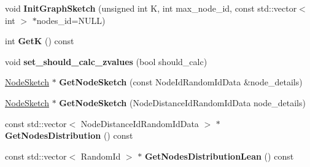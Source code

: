 \begin{DoxyCompactItemize}
\item 
\hypertarget{classall__distance__sketch_1_1GraphSketch_a6d41436a73844dd633b6184a89ce83ff}{}void {\bfseries Init\+Graph\+Sketch} (unsigned int K, int max\+\_\+node\+\_\+id, const std\+::vector$<$ int $>$ $\ast$nodes\+\_\+id=N\+U\+L\+L)\label{classall__distance__sketch_1_1GraphSketch_a6d41436a73844dd633b6184a89ce83ff}

\item 
\hypertarget{classall__distance__sketch_1_1GraphSketch_a32fef9d13b965dd7b5a776596d888a41}{}int {\bfseries Get\+K} () const \label{classall__distance__sketch_1_1GraphSketch_a32fef9d13b965dd7b5a776596d888a41}

\item 
\hypertarget{classall__distance__sketch_1_1GraphSketch_a8d5aaa1b4e94e0361ea0b1afdbfcf8bc}{}void {\bfseries set\+\_\+should\+\_\+calc\+\_\+zvalues} (bool should\+\_\+calc)\label{classall__distance__sketch_1_1GraphSketch_a8d5aaa1b4e94e0361ea0b1afdbfcf8bc}

\item 
\hypertarget{classall__distance__sketch_1_1GraphSketch_ad0b0931712a19b47983a24ef73500316}{}\hyperlink{classall__distance__sketch_1_1NodeSketch}{Node\+Sketch} $\ast$ {\bfseries Get\+Node\+Sketch} (const Node\+Id\+Random\+Id\+Data \&node\+\_\+details)\label{classall__distance__sketch_1_1GraphSketch_ad0b0931712a19b47983a24ef73500316}

\item 
\hypertarget{classall__distance__sketch_1_1GraphSketch_a696af8492f42fbbb60afbc2ff2a68a96}{}\hyperlink{classall__distance__sketch_1_1NodeSketch}{Node\+Sketch} $\ast$ {\bfseries Get\+Node\+Sketch} (Node\+Distance\+Id\+Random\+Id\+Data node\+\_\+details)\label{classall__distance__sketch_1_1GraphSketch_a696af8492f42fbbb60afbc2ff2a68a96}

\item 
\hypertarget{classall__distance__sketch_1_1GraphSketch_ae31e8b23fc7063927b2368a06bc57adb}{}const std\+::vector$<$ Node\+Distance\+Id\+Random\+Id\+Data $>$ $\ast$ {\bfseries Get\+Nodes\+Distribution} () const \label{classall__distance__sketch_1_1GraphSketch_ae31e8b23fc7063927b2368a06bc57adb}

\item 
\hypertarget{classall__distance__sketch_1_1GraphSketch_af463db872f2cc5cc635dffe4aaf136e6}{}const std\+::vector$<$ Random\+Id $>$ $\ast$ {\bfseries Get\+Nodes\+Distribution\+Lean} () const \label{classall__distance__sketch_1_1GraphSketch_af463db872f2cc5cc635dffe4aaf136e6}


\end{DoxyCompactItemize}

